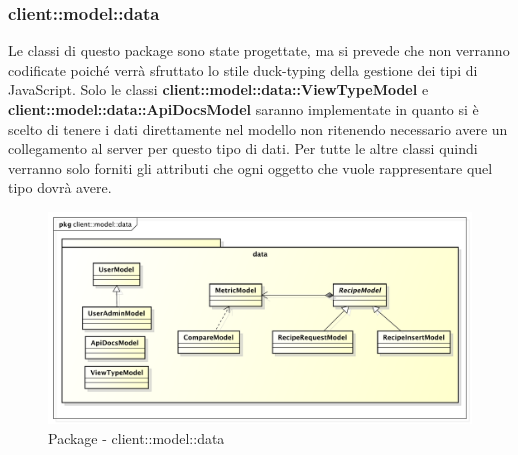 %

%

\subsubsection{client::model::data} %
\label{ssub:bdsm_app_client_model_data}
Le classi di questo package sono state progettate, ma si prevede che non verranno codificate poiché verrà sfruttato lo stile duck-typing della gestione dei tipi di JavaScript. Solo le classi \textbf{client::model::data::ViewTypeModel} e \textbf{client::model::data::ApiDocsModel} saranno implementate in quanto si è scelto di tenere i dati direttamente nel modello non ritenendo necessario avere un collegamento al server per questo tipo di dati. \newline
Per tutte le altre classi quindi verranno solo forniti gli attributi che ogni oggetto che vuole rappresentare quel tipo dovrà avere.


\begin{figure}[htbp]
	\centering
	\centerline{\includegraphics[scale=0.5]{./images/client/client_model_data.pdf}}
	\caption{Package - client::model::data}
\end{figure}

